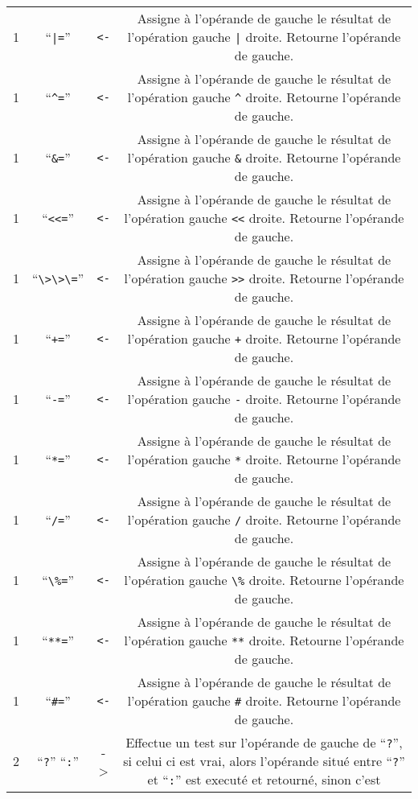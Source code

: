 \documentclass[a5paper, 12pt]{book}
\begin{document}
\begin{tabular}{c|c|c|c}
  1 & ``\verb!|=!'' & \verb!<-! &
  Assigne à l'opérande de gauche le résultat de l'opération gauche \verb!|! droite.
  Retourne l'opérande de gauche.
  \\
  1 & ``\verb!^=!'' & \verb!<-! &
  Assigne à l'opérande de gauche le résultat de l'opération gauche \verb!^! droite.
  Retourne l'opérande de gauche.
  \\
  1 & ``\verb!&=!'' & \verb!<-! &
  Assigne à l'opérande de gauche le résultat de l'opération gauche \verb!&! droite.
  Retourne l'opérande de gauche.
  \\
  1 & ``\verb!<<=!'' & \verb!<-! &
  Assigne à l'opérande de gauche le résultat de l'opération gauche \verb!<<! droite.
  Retourne l'opérande de gauche.
  \\
  1 & ``\verb!\>\>\=!'' & \verb!<-! &
  Assigne à l'opérande de gauche le résultat de l'opération gauche \verb!>>! droite.
  Retourne l'opérande de gauche.
  \\
  1 & ``\verb!+=!'' & \verb!<-! &
  Assigne à l'opérande de gauche le résultat de l'opération gauche \verb!+! droite.
  Retourne l'opérande de gauche.
  \\
  1 & ``\verb!-=!'' & \verb!<-! &
  Assigne à l'opérande de gauche le résultat de l'opération gauche \verb!-! droite.
  Retourne l'opérande de gauche.
  \\
  1 & ``\verb!*=!'' & \verb!<-! &
  Assigne à l'opérande de gauche le résultat de l'opération gauche \verb!*! droite.
  Retourne l'opérande de gauche.
  \\
  1 & ``\verb!/=!'' & \verb!<-! &
  Assigne à l'opérande de gauche le résultat de l'opération gauche \verb!/! droite.
  Retourne l'opérande de gauche.
  \\
  1 & ``\verb!\%=!'' & \verb!<-! &
  Assigne à l'opérande de gauche le résultat de l'opération gauche \verb!\%! droite.
  Retourne l'opérande de gauche.
  \\
  1 & ``\verb!**=!'' & \verb!<-! &
  Assigne à l'opérande de gauche le résultat de l'opération gauche \verb!**! droite.
  Retourne l'opérande de gauche.
  \\
  1 & ``\verb!#=!'' & \verb!<-! &
  Assigne à l'opérande de gauche le résultat de l'opération gauche \verb!#! droite.
  Retourne l'opérande de gauche.
  \\
  \hline
  2 & ``\verb!?!'' ``\verb!:!'' & -> &
  Effectue un test sur l'opérande de gauche de ``\verb!?!'', si celui ci est vrai, alors
  l'opérande situé entre ``\verb!?!'' et ``\verb!:!'' est executé et retourné, sinon c'est

\end{tabular}
\end{document}
